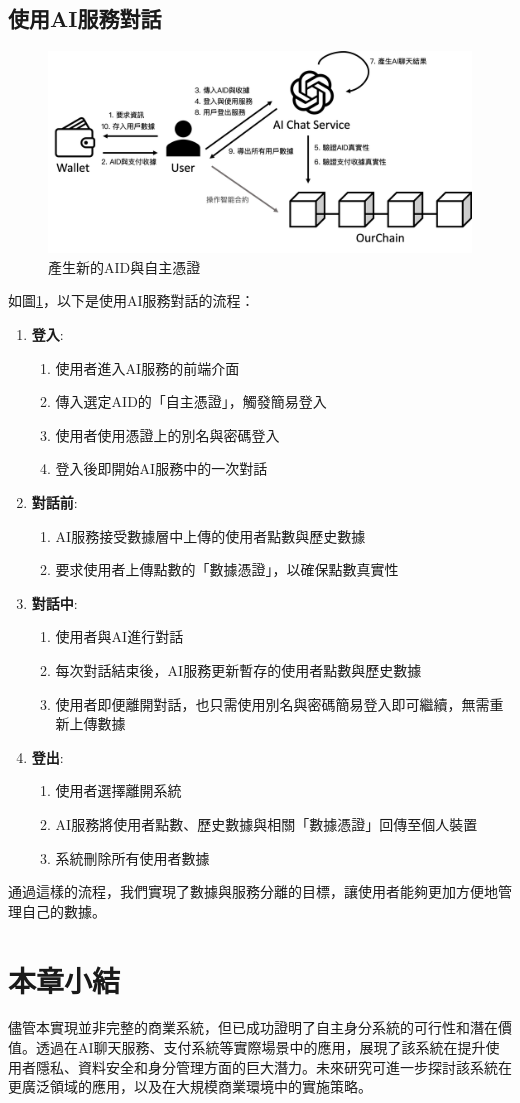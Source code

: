 \subsection{使用AI服務對話}
\begin{figure}
  \centering
  \includegraphics[width=\linewidth, keepaspectratio]{figures/implement-3.png}
  \caption{產生新的AID與自主憑證}
  \label{fig:implement-3}
\end{figure}
如圖\ref{fig:implement-3}，以下是使用AI服務對話的流程：
\begin{enumerate}
  \item \textbf{登入}:
        \begin{enumerate}
          \item 使用者進入AI服務的前端介面
          \item 傳入選定AID的「自主憑證」，觸發簡易登入
          \item 使用者使用憑證上的別名與密碼登入
          \item 登入後即開始AI服務中的一次對話
        \end{enumerate}
  \item \textbf{對話前}:
        \begin{enumerate}
          \item AI服務接受數據層中上傳的使用者點數與歷史數據
          \item 要求使用者上傳點數的「數據憑證」，以確保點數真實性
        \end{enumerate}
  \item \textbf{對話中}:
        \begin{enumerate}
          \item 使用者與AI進行對話
          \item 每次對話結束後，AI服務更新暫存的使用者點數與歷史數據
          \item 使用者即便離開對話，也只需使用別名與密碼簡易登入即可繼續，無需重新上傳數據
        \end{enumerate}
  \item \textbf{登出}:
        \begin{enumerate}
          \item 使用者選擇離開系統
          \item AI服務將使用者點數、歷史數據與相關「數據憑證」回傳至個人裝置
          \item 系統刪除所有使用者數據
        \end{enumerate}
\end{enumerate}
通過這樣的流程，我們實現了數據與服務分離的目標，讓使用者能夠更加方便地管理自己的數據。
\section{本章小結}
儘管本實現並非完整的商業系統，但已成功證明了自主身分系統的可行性和潛在價值。透過在AI聊天服務、支付系統等實際場景中的應用，展現了該系統在提升使用者隱私、資料安全和身分管理方面的巨大潛力。未來研究可進一步探討該系統在更廣泛領域的應用，以及在大規模商業環境中的實施策略。